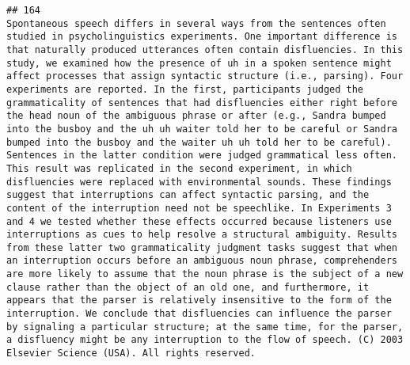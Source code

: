 \documentclass[
  english,
  man]{apa6}
\begin{document}
\begin{verbatim}
## 164                                                                                                                                                                                                                                                                                                                                                                                                                                                                                                                                                                                                                                                                                                                                                                                                                                     Spontaneous speech differs in several ways from the sentences often studied in psycholinguistics experiments. One important difference is that naturally produced utterances often contain disfluencies. In this study, we examined how the presence of uh in a spoken sentence might affect processes that assign syntactic structure (i.e., parsing). Four experiments are reported. In the first, participants judged the grammaticality of sentences that had disfluencies either right before the head noun of the ambiguous phrase or after (e.g., Sandra bumped into the busboy and the uh uh waiter told her to be careful or Sandra bumped into the busboy and the waiter uh uh told her to be careful). Sentences in the latter condition were judged grammatical less often. This result was replicated in the second experiment, in which disfluencies were replaced with environmental sounds. These findings suggest that interruptions can affect syntactic parsing, and the content of the interruption need not be speechlike. In Experiments 3 and 4 we tested whether these effects occurred because listeners use interruptions as cues to help resolve a structural ambiguity. Results from these latter two grammaticality judgment tasks suggest that when an interruption occurs before an ambiguous noun phrase, comprehenders are more likely to assume that the noun phrase is the subject of a new clause rather than the object of an old one, and furthermore, it appears that the parser is relatively insensitive to the form of the interruption. We conclude that disfluencies can influence the parser by signaling a particular structure; at the same time, for the parser, a disfluency might be any interruption to the flow of speech. (C) 2003 Elsevier Science (USA). All rights reserved.

\end{verbatim}
\end{document}
